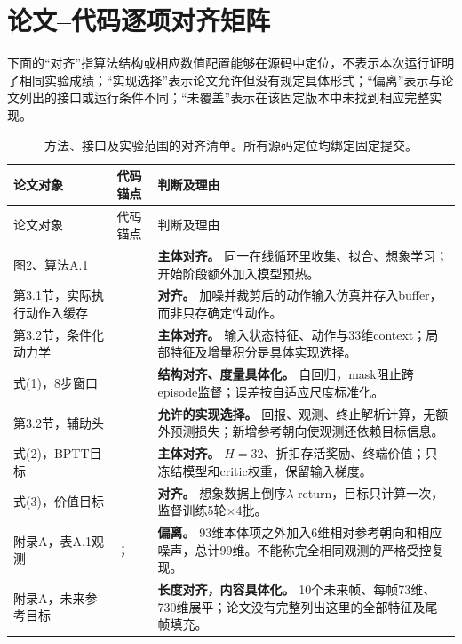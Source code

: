 \section{论文--代码逐项对齐矩阵}\label{sec:matrix}
下面的“对齐”指算法结构或相应数值配置能够在源码中定位，不表示本次运行证明了相同实验成绩；“实现选择”表示论文允许但没有规定具体形式；“偏离”表示与论文列出的接口或运行条件不同；“未覆盖”表示在该固定版本中未找到相应完整实现。

\small
\begin{longtable}{@{}P{30mm}P{45mm}P{79mm}@{}}
\caption{方法、接口及实验范围的对齐清单。所有源码定位均绑定固定提交。}\\
\toprule 论文对象 & 代码锚点 & 判断及理由\\\midrule\endfirsthead
\toprule 论文对象 & 代码锚点 & 判断及理由\\\midrule\endhead
图2、算法A.1 &  & \textbf{主体对齐。} 同一在线循环里收集、拟合、想象学习；开始阶段额外加入模型预热。\\
第3.1节，实际执行动作入缓存 &  & \textbf{对齐。} 加噪并裁剪后的动作输入仿真并存入buffer，而非只存确定性动作。\\
第3.2节，条件化动力学 &  & \textbf{主体对齐。} 输入状态特征、动作与33维context；局部特征及增量积分是具体实现选择。\\
式(1)，8步窗口 &  & \textbf{结构对齐、度量具体化。} 自回归，mask阻止跨episode监督；误差按自适应尺度标准化。\\
第3.2节，辅助头 &  & \textbf{允许的实现选择。} 回报、观测、终止解析计算，无额外预测损失；新增参考朝向使观测还依赖目标信息。\\
式(2)，BPTT目标 &  & \textbf{主体对齐。} $H=32$、折扣存活奖励、终端价值；只冻结模型和critic权重，保留输入梯度。\\
式(3)，价值目标 &  & \textbf{对齐。} 想象数据上倒序$\lambda$-return，目标只计算一次，监督训练5轮$\times$4批。\\
附录A，表A.1观测 & ； & \textbf{偏离。} 93维本体项之外加入6维相对参考朝向和相应噪声，总计99维。不能称完全相同观测的严格受控复现。\\
附录A，未来参考目标 &  & \textbf{长度对齐，内容具体化。} 10个未来帧、每帧73维、730维展平；论文没有完整列出这里的全部特征及尾帧填充。\\

\end{longtable}
